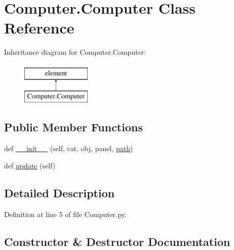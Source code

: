 \hypertarget{classComputer_1_1Computer}{}\section{Computer.\+Computer Class Reference}
\label{classComputer_1_1Computer}
Inheritance diagram for Computer.\+Computer\+:\begin{figure}[H]
\begin{center}
\leavevmode
\includegraphics[height=2.000000cm]{classComputer_1_1Computer}
\end{center}
\end{figure}
\subsection*{Public Member Functions}
\begin{DoxyCompactItemize}
\item 
def \hyperlink{classComputer_1_1Computer_a9dd9b2c522763b9bdeaa185494f7693b}{\+\_\+\+\_\+init\+\_\+\+\_\+} (self, cat, obj, panel, \hyperlink{classHierarchy_aa7990fa7caf132d83e361ce033c6c65a}{path})
\item 
def \hyperlink{classComputer_1_1Computer_a41670b7dfe9ddf2e5070e55819e9b057}{update} (self)
\end{DoxyCompactItemize}


\subsection{Detailed Description}


Definition at line 5 of file Computer.\+py.



\subsection{Constructor \& Destructor Documentation}
\mbox{\label{classComputer_1_1Computer_a9dd9b2c522763b9bdeaa185494f7693b}} 
